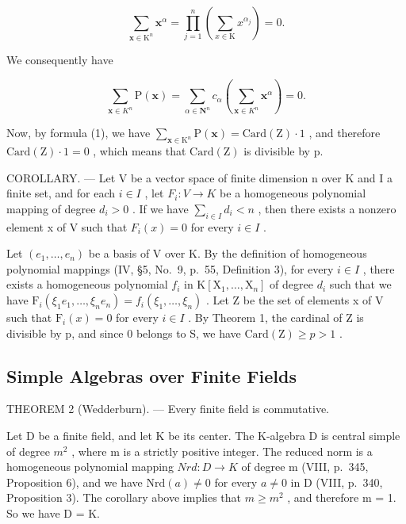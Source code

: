 \[
\sum_ {\mathbf {x} \in \mathrm{K} ^ {n}} \mathbf {x} ^ {\alpha} = \prod_ {j = 1} ^ {n} \left(\sum_ {x \in \mathrm{K}} x ^ {\alpha_ {j}}\right) = 0.
\]

We consequently have

\[
\sum_ {\mathbf {x} \in K ^ {n}} \mathrm{P} (\mathbf {x}) = \sum_ {\alpha \in \mathbf {N} ^ {n}} c _ {\alpha} \left(\sum_ {\mathbf {x} \in K ^ {n}} \mathbf {x} ^ {\alpha}\right) = 0.
\]

Now, by formula (1), we have \(\sum_{\mathbf{x}\in\mathrm{K}^{n}}\mathrm{P}(\mathbf{x})=\mathrm{Card}(\mathrm{Z})\cdot1\) , and therefore \(\mathrm{Card}(\mathrm{Z})\cdot1=0\) , which means that \(\mathrm{Card}(\mathrm{Z})\) is divisible by p.

COROLLARY. --- Let V be a vector space of finite dimension n over K and I a finite set, and for each \(i \in I\) , let \(F_{i}: V \to K\) be a homogeneous polynomial mapping of degree \(d_{i} > 0\) . If we have \(\sum_{i \in I} d_{i} < n\) , then there exists a nonzero element x of V such that \(F_{i}(x) = 0\) for every \(i \in I\) .

Let \((e_{1},\ldots,e_{n})\) be a basis of V over K. By the definition of homogeneous polynomial mappings (IV, §5, No.~9, p.~55, Definition 3), for every \(i\in I\) , there exists a homogeneous polynomial \(f_{i}\) in \(\mathrm{K}[\mathrm{X}_{1},\ldots,\mathrm{X}_{n}]\) of degree \(d_{i}\) such that we have \(\mathrm{F}_{i}(\xi_{1}e_{1},\ldots,\xi_{n}e_{n})=f_{i}(\xi_{1},\ldots,\xi_{n})\) . Let Z be the set of elements x of V such that \(\mathrm{F}_{i}(x)=0\) for every \(i\in I\) . By Theorem 1, the cardinal of Z is divisible by p, and since 0 belongs to S, we have \(\mathrm{Card}(\mathrm{Z})\geqslant p>1\) .

\subsection{Simple Algebras over Finite Fields}

THEOREM 2 (Wedderburn). --- Every finite field is commutative.

Let D be a finite field, and let K be its center. The K-algebra D is central simple of degree \(m^{2}\) , where m is a strictly positive integer. The reduced norm is a homogeneous polynomial mapping \(Nrd : D \to K\) of degree m (VIII, p.~345, Proposition 6), and we have \(\text{Nrd}(a) \neq 0\) for every \(a \neq 0\) in D (VIII, p.~340, Proposition 3). The corollary above implies that \(m \geqslant m^{2}\) , and therefore m = 1. So we have D = K.

